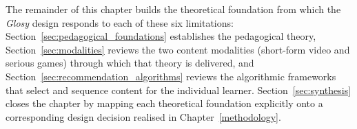     \begin{table}[htbp]
        \centering
        \small
        \caption{Comparative feature matrix: Established LLPs vs. Glosy framework.}
        \label{tab:platform_comparison}
    \end{table}

    The remainder of this chapter builds the theoretical foundation from which the \textit{Glosy} design responds to each of these six limitations: Section~\ref{sec:pedagogical_foundations} establishes the pedagogical theory, Section~\ref{sec:modalities} reviews the two content modalities (short-form video and serious games) through which that theory is delivered, and Section~\ref{sec:recommendation_algorithms} reviews the algorithmic frameworks that select and sequence content for the individual learner. Section~\ref{sec:synthesis} closes the chapter by mapping each theoretical foundation explicitly onto a corresponding design decision realised in Chapter~\ref{methodology}.


